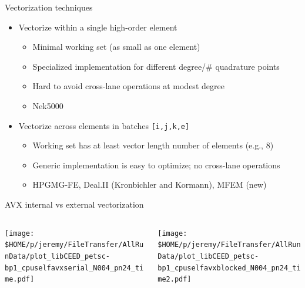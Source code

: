 \documentclass[aspectratio=1610]{beamer}
\begin{document}
\begin{frame}{Vectorization techniques}
  \begin{itemize}
  \item Vectorize within a single high-order element
    \begin{itemize}
    \item Minimal working set (as small as one element)
    \item Specialized implementation for different degree/\# quadrature points
    \item Hard to avoid cross-lane operations at modest degree
    \item Nek5000
    \end{itemize}
  \item Vectorize across elements in batches \texttt{[i,j,k,e]}
    \begin{itemize}
    \item Working set has at least vector length number of elements (e.g., 8)
    \item Generic implementation is easy to optimize; no cross-lane operations
    \item HPGMG-FE, Deal.II (Kronbichler and Kormann), MFEM (new)
    \end{itemize}
  \end{itemize}
\end{frame}


\begin{frame}{AVX internal vs external vectorization}
  \begin{columns}
    \begin{column}{0.5\textwidth}
      \texttt{[image: \$HOME/p/jeremy/FileTransfer/AllRunData/plot\_libCEED\_petsc-bp1\_cpuselfavxserial\_N004\_pn24\_time.pdf]}
    \end{column}
    \begin{column}{0.5\textwidth}
      \texttt{[image: \$HOME/p/jeremy/FileTransfer/AllRunData/plot\_libCEED\_petsc-bp1\_cpuselfavxblocked\_N004\_pn24\_time2.pdf]}
    \end{column}
  \end{columns}
\end{frame}
\end{document}
